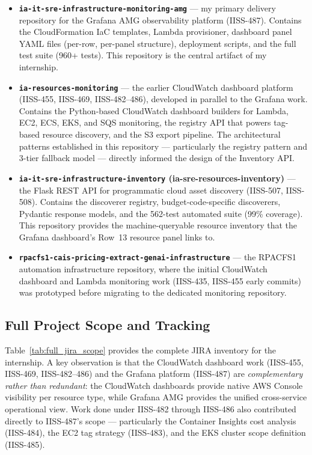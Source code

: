 \begin{itemize}
    \item \textbf{\texttt{ia-it-sre-infrastructure-monitoring-amg}} --- my primary
          delivery repository for the Grafana AMG observability platform (IISS-487).
          Contains the CloudFormation IaC templates, Lambda provisioner, dashboard
          panel YAML files (per-row, per-panel structure), deployment scripts, and
          the full test suite (960+ tests). This repository is the central artifact
          of my internship.

    \item \textbf{\texttt{ia-resources-monitoring}} --- the earlier CloudWatch
          dashboard platform (IISS-455, IISS-469, IISS-482--486), developed in
          parallel to the Grafana work. Contains the Python-based CloudWatch
          dashboard builders for Lambda, EC2, ECS, EKS, and SQS monitoring, the
          registry API that powers tag-based resource discovery, and the S3 export
          pipeline. The architectural patterns established in this repository ---
          particularly the registry pattern and 3-tier fallback model --- directly
          informed the design of the Inventory API.

    \item \textbf{\texttt{ia-it-sre-infrastructure-inventory} (ia-sre-resources-inventory)} ---
          the Flask REST API for programmatic cloud asset discovery (IISS-507, IISS-508).
          Contains the discoverer registry, budget-code-specific discoverers, Pydantic
          response models, and the 562-test automated suite (99\% coverage). This
          repository provides the machine-queryable resource inventory that the
          Grafana dashboard's Row~13 resource panel links to.

    \item \textbf{\texttt{rpacfs1-cais-pricing-extract-genai-infrastructure}} --- the
          RPACFS1 automation infrastructure repository, where the initial CloudWatch
          dashboard and Lambda monitoring work (IISS-435, IISS-455 early commits)
          was prototyped before migrating to the dedicated monitoring repository.
\end{itemize}

\subsection{Full Project Scope and Tracking}

Table~\ref{tab:full_jira_scope} provides the complete JIRA inventory for the
internship. A key observation is that the CloudWatch dashboard work (IISS-455,
IISS-469, IISS-482--486) and the Grafana platform (IISS-487) are
\emph{complementary rather than redundant}: the CloudWatch dashboards provide
native AWS Console visibility per resource type, while Grafana AMG provides
the unified cross-service operational view. Work done under IISS-482 through
IISS-486 also contributed directly to IISS-487's scope --- particularly the
Container Insights cost analysis (IISS-484), the EC2 tag strategy (IISS-483),
and the EKS cluster scope definition (IISS-485).


